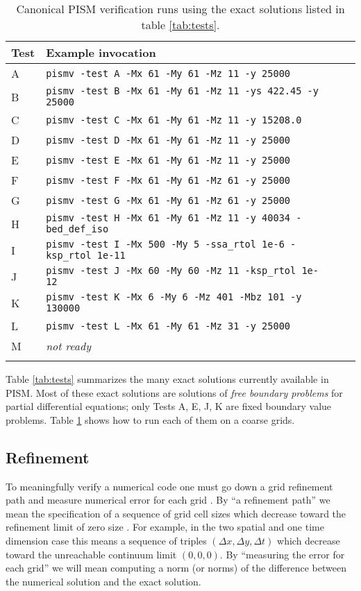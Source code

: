 \begin{table}[ht]
\centering
\caption{Canonical PISM verification runs using the exact solutions listed in table \ref{tab:tests}.}\label{tab:tests-exec}
\small
\begin{tabular}{@{}llll}\hline
\textbf{Test} & \textbf{Example invocation}  \\ \hline
A & \verb|pismv -test A -Mx 61 -My 61 -Mz 11 -y 25000| \\
B & \verb|pismv -test B -Mx 61 -My 61 -Mz 11 -ys 422.45 -y 25000|  \\
C & \verb|pismv -test C -Mx 61 -My 61 -Mz 11 -y 15208.0|  \\
D & \verb|pismv -test D -Mx 61 -My 61 -Mz 11 -y 25000|  \\
E & \verb|pismv -test E -Mx 61 -My 61 -Mz 11 -y 25000|  \\
F & \verb|pismv -test F -Mx 61 -My 61 -Mz 61 -y 25000|  \\
G & \verb|pismv -test G -Mx 61 -My 61 -Mz 61 -y 25000|  \\
H & \verb|pismv -test H -Mx 61 -My 61 -Mz 11 -y 40034 -bed_def_iso| \\
I & \verb|pismv -test I -Mx 500 -My 5 -ssa_rtol 1e-6 -ksp_rtol 1e-11| \\
J & \verb|pismv -test J -Mx 60 -My 60 -Mz 11 -ksp_rtol 1e-12| \\
K & \verb|pismv -test K -Mx 6 -My 6 -Mz 401 -Mbz 101 -y 130000| \\
L & \verb|pismv -test L -Mx 61 -My 61 -Mz 31 -y 25000| \\
M & \emph{not ready} \\
\hline
\normalsize
\end{tabular}
\end{table}

Table \ref{tab:tests} summarizes the many exact solutions currently available in PISM.  Most of these exact solutions are solutions of \emph{free boundary problems} for partial differential equations; only Tests A, E, J, K are fixed boundary value problems.  Table \ref{tab:tests-exec} shows how to run each of them on a coarse grids.

\subsection{Refinement}  To meaningfully verify a numerical code one must go down a grid refinement path and measure numerical error for each grid \cite{Roache}.  By ``a refinement path'' we mean the specification of a sequence of grid cell sizes which decrease toward the refinement limit of zero size \cite{MortonMayers}.  For example, in the two spatial and one time dimension case this means a sequence of triples $(\Delta x,\Delta y,\Delta t)$ which decrease toward the unreachable continuum limit $(0,0,0)$.  By ``measuring the error for each grid'' we will mean computing a norm (or norms) of the difference between the numerical solution and the exact solution.

